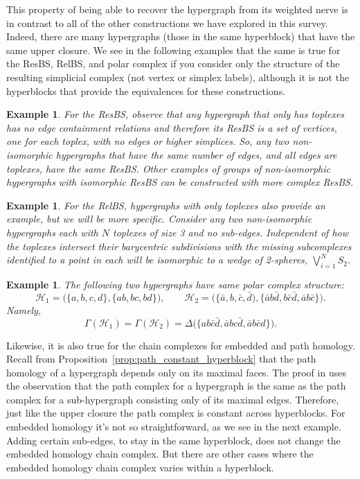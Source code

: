 \documentclass{amsart}
\newtheorem{example}[theorem]{Example}
\renewcommand{\H}{\mathcal{H}}
\begin{document}
This property of being able to recover the hypergraph from its weighted nerve is in contrast to all of the other constructions we have explored in this survey. Indeed, there are many hypergraphs (those in the same hyperblock) that have the same upper closure. We see in the following examples that the same is true for the ResBS, RelBS, and polar complex if you consider only the structure of the resulting simplicial complex (not vertex or simplex labels), although it is not the hyperblocks that provide the equivalences for these constructions.

\begin{example}
    For the ResBS, observe that any hypergraph that only has toplexes has no edge containment relations and therefore its ResBS is a set of vertices, one for each toplex, with no edges or higher simplices. So, any two non-isomorphic hypergraphs that have the same number of edges, and all edges are toplexes, have the same ResBS.
    Other examples of groups of non-isomorphic hypergraphs with isomorphic ResBS can be constructed with more complex ResBS.
\end{example}

\begin{example}
    For the RelBS, hypergraphs with only toplexes also provide an example, but we will be more specific. Consider any two non-isomorphic hypergraphs each with $N$ toplexes of size 3 and no sub-edges. Independent of how the toplexes intersect their barycentric subdivisions with the missing subcomplexes identified to a point in each will be isomorphic to a wedge of 2-spheres, $\bigvee_{i=1}^N S_2$.
\end{example}

\begin{example}
The following two hypergraphs have same polar complex structure:
\[
    \H_1 = \big(\{a, b, c, d\}, \{ab, bc, bd\}\big), \qquad
    \H_2 = \big(\{\bar{a}, b, \bar{c}, \bar{d}), \{ \bar{a}b\bar{d}, b\bar{c}\bar{d}, \bar{a}b\bar{c}\}\big).\]
Namely, 
\[
\Gamma(\H_1) = \Gamma(\H_2) = \Delta\big(\{ ab\bar{c}\bar{d}, \bar{a}bc\bar{d}, \bar{a}b\bar{c}d\}\big).
\]
\end{example}

Likewise, it is also true for the chain complexes for embedded and path homology. Recall from Proposition~\ref{prop:path_constant_hyperblock} that the path homology of a hypergraph depends only on its maximal faces. 
The proof in \cite{GrigoryanJimenezMuranov2019} uses the observation that the path complex for a hypergraph is the same as the path complex for a sub-hypergraph consisting only of its maximal edges.
Therefore, just like the upper closure the path complex is constant across hyperblocks.
For embedded homology it's not so straightforward, as we see in the next example. Adding certain sub-edges, to stay in the same hyperblock, does not change the embedded homology chain complex. But there are other cases where the embedded homology chain complex varies within a hyperblock.
\end{document}
